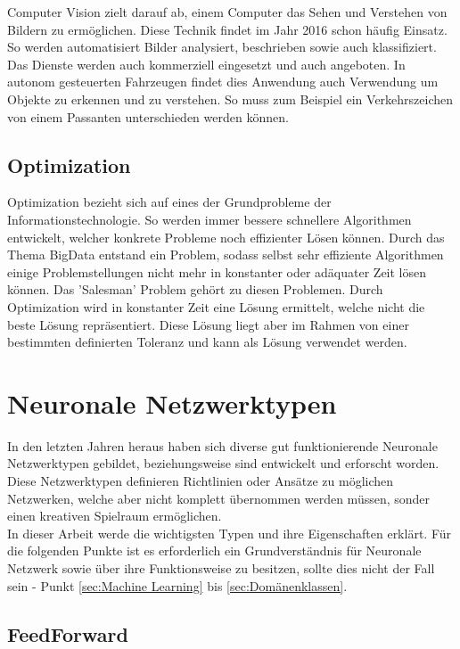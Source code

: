 Computer Vision zielt darauf ab, einem Computer das Sehen und Verstehen von Bildern zu ermöglichen. 
Diese Technik findet im Jahr 2016 schon häufig Einsatz. 
So werden automatisiert Bilder analysiert, beschrieben sowie auch klassifiziert. 
Das Dienste werden auch kommerziell eingesetzt und auch angeboten. 
In autonom gesteuerten Fahrzeugen findet dies Anwendung auch Verwendung um Objekte zu erkennen und zu verstehen. 
So muss zum Beispiel ein Verkehrszeichen von einem Passanten unterschieden werden können.

\subsection{Optimization}
\label{subsec:Optimization}

Optimization bezieht sich auf eines der Grundprobleme der Informationstechnologie. 
So werden immer bessere schnellere Algorithmen entwickelt, welcher konkrete Probleme noch effizienter Lösen können. 
Durch das Thema BigData entstand ein Problem, sodass selbst sehr effiziente Algorithmen einige Problemstellungen nicht mehr in konstanter oder adäquater Zeit lösen können. 
Das 'Salesman' Problem gehört zu diesen Problemen. 
Durch Optimization wird in konstanter Zeit eine Lösung ermittelt, welche nicht die beste Lösung repräsentiert. 
Diese Lösung liegt aber im Rahmen von einer bestimmten definierten Toleranz und kann als Lösung verwendet werden.


\section{Neuronale Netzwerktypen}

In den letzten Jahren heraus haben sich diverse gut funktionierende Neuronale Netzwerktypen gebildet,  beziehungsweise sind entwickelt und erforscht worden. 
Diese Netzwerktypen definieren Richtlinien oder Ansätze zu möglichen Netzwerken, welche aber nicht komplett übernommen werden müssen, sonder einen kreativen Spielraum ermöglichen. \\

In dieser Arbeit werde die wichtigsten Typen und ihre Eigenschaften erklärt. 
Für die folgenden Punkte ist es erforderlich ein Grundverständnis für Neuronale Netzwerk sowie über ihre Funktionsweise zu besitzen, sollte dies nicht der Fall sein - Punkt \ref{sec:Machine Learning} bis \ref{sec:Domänenklassen}.

\subsection{FeedForward}
\label{subsec:FeedForward}

